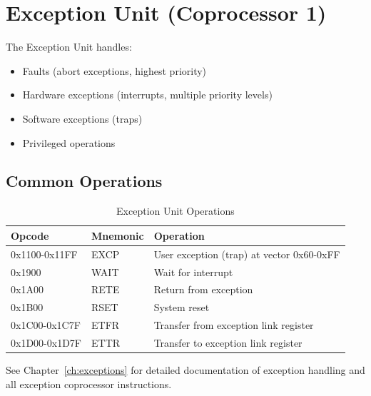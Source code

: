 \section{Exception Unit (Coprocessor 1)}

The Exception Unit handles:
\begin{itemize}
	\item Faults (abort exceptions, highest priority)
	\item Hardware exceptions (interrupts, multiple priority levels)
	\item Software exceptions (traps)
	\item Privileged operations
\end{itemize}

\subsection{Common Operations}

\begin{table}[H]
	\centering
	\begin{tabular}{llp{8cm}}
		\toprule
		\textbf{Opcode} & \textbf{Mnemonic} & \textbf{Operation}                        \\
		\midrule
		0x1100-0x11FF   & EXCP              & User exception (trap) at vector 0x60-0xFF \\
		0x1900          & WAIT              & Wait for interrupt                        \\
		0x1A00          & RETE              & Return from exception                     \\
		0x1B00          & RSET              & System reset                              \\
		0x1C00-0x1C7F   & ETFR              & Transfer from exception link register     \\
		0x1D00-0x1D7F   & ETTR              & Transfer to exception link register       \\
		\bottomrule
	\end{tabular}
	\caption{Exception Unit Operations}
\end{table}

See Chapter~\ref{ch:exceptions} for detailed documentation of exception handling and all exception coprocessor
instructions.
